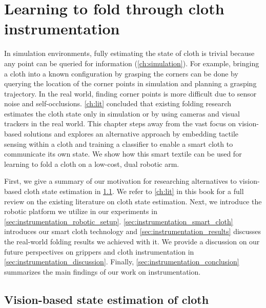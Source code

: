 \documentclass[\home/main.tex]{subfiles}
\begin{document}


\chapter{Learning to fold through cloth instrumentation}\label{ch:instrumentation}

In simulation environments, fully estimating the state of cloth is trivial because any point can be queried for information (\cref{ch:simulation}).
For example, bringing a cloth into a known configuration by grasping the corners can be done by querying the location of the corner points in simulation and planning a grasping trajectory.
In the real world, finding corner points is more difficult due to sensor noise and self-occlusions. \cref{ch:lit} concluded that existing folding research estimates the cloth state only in simulation or by using cameras and visual trackers in the real world. This chapter steps away from the vast focus on vision-based solutions and explores an alternative approach by embedding tactile sensing within a cloth and training a classifier to enable a smart cloth to communicate its own state. We show how this smart textile can be used for learning to fold a cloth on a low-cost, dual robotic arm.

First, we give a summary of our motivation for researching alternatives to vision-based cloth state estimation in \cref{sec:instrumentation_lit}. We refer to \cref{ch:lit} in this book for a full review on the existing literature on cloth state estimation. Next, we introduce the robotic platform we utilize in our experiments in \cref{sec:instrumentation_robotic_setup}. \cref{sec:instrumentation_smart_cloth} introduces our smart cloth technology and \cref{sec:instrumentation_results} discusses the real-world folding results we achieved with it.
We provide a discussion on our future perspectives on grippers and cloth instrumentation in \cref{sec:instrumentation_discussion}.
Finally, \cref{sec:instrumentation_conclusion} summarizes the main findings of our work on instrumentation.

\section{Vision-based state estimation of cloth} \label{sec:instrumentation_lit}
\end{document}
